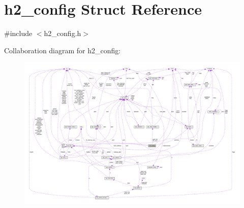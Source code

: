 \hypertarget{structh2__config}{}\section{h2\+\_\+config Struct Reference}
\label{structh2__config}


{\ttfamily \#include $<$h2\+\_\+config.\+h$>$}



Collaboration diagram for h2\+\_\+config\+:
\nopagebreak
\begin{figure}[H]
\begin{center}
\leavevmode
\includegraphics[width=350pt]{structh2__config__coll__graph}
\end{center}
\end{figure}
